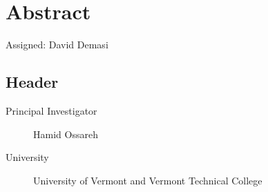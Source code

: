 \section{Abstract}
Assigned: David Demasi \cite{brandon:2008}

\subsection{Header}
\begin{description}
\item[Principal Investigator] Hamid Ossareh
\item[University] University of Vermont and Vermont Technical College
\end{description}

